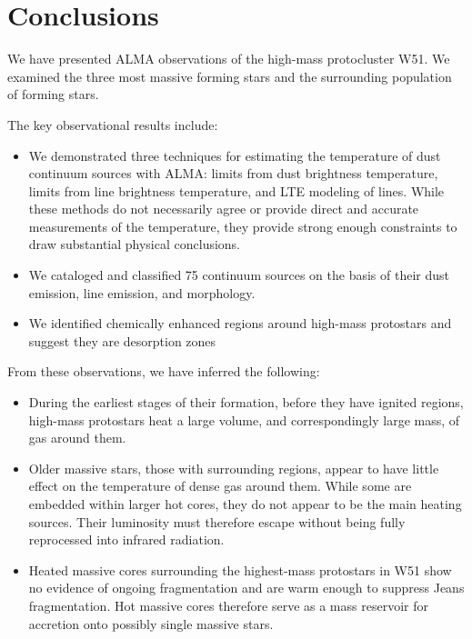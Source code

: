 \documentclass{aa}
\begin{document}
\section{Conclusions}
\label{sec:conclusion}

We have presented ALMA observations of the high-mass protocluster W51.  We
examined the three most massive forming stars and the surrounding population of
forming stars.  


The key observational results include:
\begin{itemize}
    \item We demonstrated three techniques for estimating the temperature of
        dust continuum sources with ALMA: limits from dust brightness
        temperature, limits from line brightness temperature, and LTE modeling
        of \methanol lines.  While these methods do not necessarily agree
        or provide direct and accurate measurements of the temperature, they
        provide strong enough constraints to draw substantial physical conclusions.
    \item We cataloged and classified 75 continuum sources on the basis of their
        dust emission, line emission, and morphology.  
    \item We identified chemically enhanced regions around high-mass protostars
        and suggest they are desorption zones
\end{itemize}

From these observations, we have inferred the following: 
\begin{itemize}
    \item During the earliest stages of their formation, before they have 
        ignited \hii regions, high-mass protostars heat a large volume,
        and correspondingly large mass, of gas around them.
    \item Older massive stars, those with surrounding \hii regions, appear
        to have little effect on the temperature of dense gas around them.
        While some are embedded within larger hot cores, they do not appear to
        be the main
        heating sources.  Their luminosity must therefore escape without
        being fully reprocessed into infrared radiation.
    \item Heated massive cores surrounding the highest-mass protostars in
        W51 show no evidence of ongoing fragmentation and are warm enough
        to suppress Jeans fragmentation.  Hot massive cores therefore serve as
        a mass reservoir for accretion onto possibly single massive stars.
\end{itemize}
\end{document}

